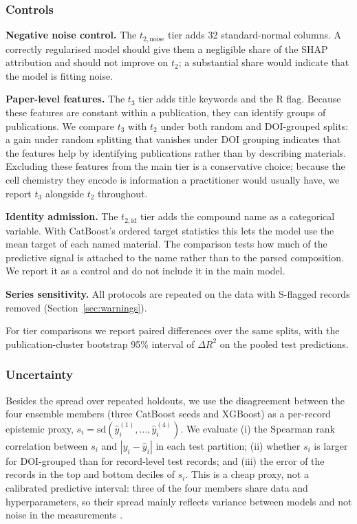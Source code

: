 \documentclass[journal=jcisd8,manuscript=article,layout=traditional]{achemso}
\begin{document}
\subsubsection{Controls}
\label{sec:controls}

\textbf{Negative noise control.} The $t_{2,\mathrm{noise}}$ tier adds 32 standard-normal columns. A correctly regularised model should give them a negligible share of the SHAP attribution and should not improve on $t_2$; a substantial share would indicate that the model is fitting noise.

\textbf{Paper-level features.} The $t_3$ tier adds title keywords and the R flag. Because these features are constant within a publication, they can identify groups of publications. We compare $t_3$ with $t_2$ under both random and DOI-grouped splits: a gain under random splitting that vanishes under DOI grouping indicates that the features help by identifying publications rather than by describing materials. Excluding these features from the main tier is a conservative choice; because the cell chemistry they encode is information a practitioner would usually have, we report $t_3$ alongside $t_2$ throughout.

\textbf{Identity admission.} The $t_{2,\mathrm{id}}$ tier adds the compound name as a categorical variable. With CatBoost's ordered target statistics this lets the model use the mean target of each named material. The comparison tests how much of the predictive signal is attached to the name rather than to the parsed composition. We report it as a control and do not include it in the main model.

\textbf{Series sensitivity.} All protocols are repeated on the data with S-flagged records removed (Section~\ref{sec:warnings}).

For tier comparisons we report paired differences over the same splits, with the publication-cluster bootstrap 95\% interval of $\Delta R^2$ on the pooled test predictions.

\subsubsection{Uncertainty}
\label{sec:uncertainty_methods}

Besides the spread over repeated holdouts, we use the disagreement between the four ensemble members (three CatBoost seeds and XGBoost) as a per-record epistemic proxy, $s_i = \mathrm{sd}(\hat y_i^{(1)},\ldots,\hat y_i^{(4)})$. We evaluate (i) the Spearman rank correlation between $s_i$ and $|y_i - \hat y_i|$ in each test partition; (ii) whether $s_i$ is larger for DOI-grouped than for record-level test records; and (iii) the error of the records in the top and bottom deciles of $s_i$. This is a cheap proxy, not a calibrated predictive interval: three of the four members share data and hyperparameters, so their spread mainly reflects variance between models and not noise in the measurements \cite{tran2020uq}.
\end{document}
